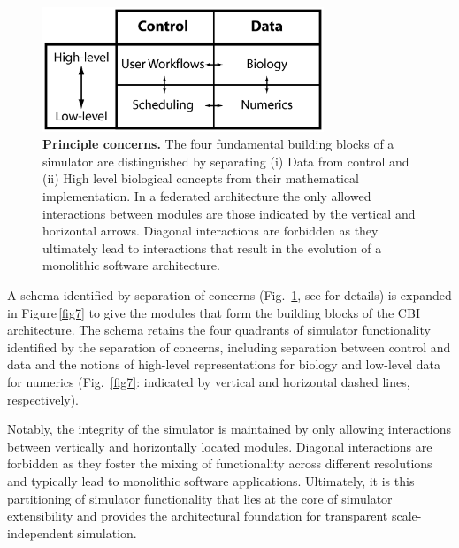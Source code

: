 \documentclass[10pt,letterpaper]{article}
\begin{document}
\begin{figure}[ht]
\begin{center}
\includegraphics[width=0.75\textwidth]{figures/pone.0028956.g002.png}
\end{center}
\caption{\small{\textbf{Principle concerns.} The four fundamental building blocks of a simulator are distinguished by separating (i) Data from control and (ii) High level biological concepts from their mathematical implementation. In a federated architecture the only allowed interactions between modules are those indicated by the vertical and horizontal arrows. Diagonal interactions are forbidden as they ultimately lead to interactions that result in the evolution of a monolithic software architecture.}}
\label{fig6}
\end{figure}

A schema identified by separation of concerns (Fig.~\ref{fig6}, see \cite{cornelis12} for details) is expanded in Figure\,\ref{fig7} to give the modules that form the building blocks of the CBI architecture.  The schema retains the four quadrants of simulator functionality identified by the separation of concerns, including separation between control and data  and the notions of high-level representations for biology and low-level data for numerics (Fig.~\ref{fig7}: indicated by vertical and horizontal dashed lines, respectively).

Notably, the integrity of the simulator is maintained by only allowing interactions between vertically and horizontally located modules. Diagonal interactions are forbidden as they foster the mixing of functionality across different resolutions and typically lead to monolithic software applications. Ultimately, it is this partitioning of simulator functionality that lies at the core of simulator extensibility and provides the architectural foundation for transparent scale-independent simulation.
\end{document}
